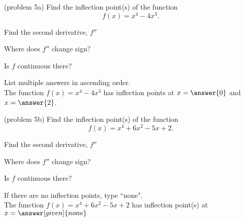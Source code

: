 \documentclass{ximera}
\begin{document}
\begin{example}[example 5]
\begin{image}
\end{image}

\end{example}

\begin{problem}(problem 5a)
  Find the inflection point(s) of the function
  \[
     f(x) = x^4 - 4x^3.
  \]
  
    \begin{hint}
      Find the second derivative, $f''$
    \end{hint}
    \begin{hint}
      Where does $f''$ change sign?
    \end{hint}
    \begin{hint}
      Is $f$ continuous there?
    \end{hint}  
		
		List multiple answers in ascending order.\\
		The function $f(x) = x^4 - 4x^3$ has inflection points at 
		$x =\answer{0}$ and $x = \answer{2}$.
		
	
\end{problem}


\begin{problem}(problem 5b)
  Find the inflection point(s) of the function
  \[
     f(x) = x^4 + 6x^2 - 5x + 2.
  \]
  
    \begin{hint}
      Find the second derivative, $f''$
    \end{hint}
    \begin{hint}
      Where does $f''$ change sign?
    \end{hint}
    \begin{hint}
      Is $f$ continuous there?
    \end{hint}  
		If there are no inflection points, type ``none".\\ 
		The function $f(x) = x^4 + 6x^2 - 5x + 2$ has inflection 
		point(s) at $x =\answer[given]{none}$
	
\end{problem}
\end{document}
